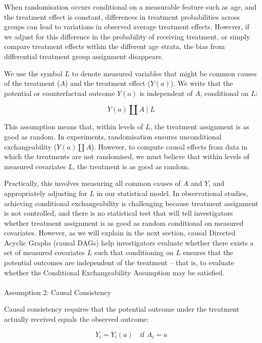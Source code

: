 \documentclass[
  singlecolumn]{article}
\makeatletter
\let\oldparagraph\paragraph
\renewcommand{\paragraph}{
    \@ifstar
      \xxxParagraphStar
      \xxxParagraphNoStar
  }
\newcommand{\xxxParagraphStar}[1]{\oldparagraph*{#1}\mbox{}}
\newcommand{\xxxParagraphNoStar}[1]{\oldparagraph{#1}\mbox{}}
\makeatother
\begin{document}
When randomisation occurs conditional on a measurable feature such as
age, and the treatment effect is constant, differences in treatment
probabilities across groups can lead to variations in observed average
treatment effects. However, if we adjust for this difference in the
probability of receiving treatment, or simply compare treatment effects
within the different age strata, the bias from differential treatment
group assignment disappears.

We use the symbol \(L\) to denote measured variables that might be
common causes of the treatment (\(A\)) and the treatment effect
(\(Y(a)\)). We write that the potential or counterfactual outcome
\(Y(a)\) is independent of \(A\), conditional on \(L\):

\[
Y(a) \coprod A \mid L
\]

This assumption means that, within levels of \(L\), the treatment
assignment is as good as random. In experiments, randomisation ensures
unconditional exchangeability (\(Y(a) \coprod A\)). However, to compute
causal effects from data in which the treatments are not randomised, we
must believe that within levels of measured covariates \(L\), the
treatment is as good as random.

Practically, this involves measuring all common causes of \(A\) and
\(Y\), and appropriately adjusting for \(L\) in our statistical model.
In observational studies, achieving conditional exchangeability is
challenging because treatment assignment is not controlled, and there is
no statistical test that will tell investigators whether treatment
assignment is as good as random conditional on measured covariates.
However, as we will explain in the next section, causal Directed Acyclic
Graphs (causal DAGs) help investigators evaluate whether there exists a
set of measured covariates \(L\) such that conditioning on \(L\) ensures
that the potential outcomes are independent of the treatment -- that is,
to evaluate whether the Conditional Exchangeability Assumption may be
satisfied.

\paragraph{Assumption 2: Causal
Consistency}\label{assumption-2-causal-consistency}

Causal consistency requires that the potential outcome under the
treatment actually received equals the observed outcome:

\[
Y_i = Y_i(a) \quad \text{if } A_i = a
\]
\end{document}
